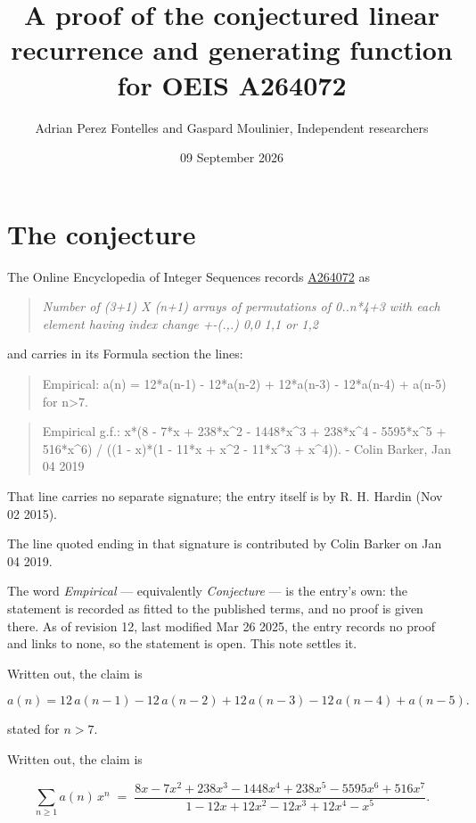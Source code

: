 \documentclass[11pt]{article}
\title{A proof of the conjectured linear recurrence and generating function for OEIS A264072}
\author{Adrian Perez Fontelles and Gaspard Moulinier, Independent researchers}
\date{09 September 2026}
\theoremstyle{definition}
\begin{document}
\maketitle
\section{The conjecture}

The Online Encyclopedia of Integer Sequences records \href{https://oeis.org/A264072}{A264072} as

\begin{quote}\itshape Number of (3+1) X (n+1) arrays of permutations of 0..n*4+3 with each element having index change +-(.,.) 0,0 1,1 or 1,2\end{quote}

and carries in its Formula section the lines:

\begin{quote}\ttfamily Empirical: a(n) = 12*a(n-1) - 12*a(n-2) + 12*a(n-3) - 12*a(n-4) + a(n-5) for n>7.\end{quote}

\begin{quote}\ttfamily Empirical g.f.: x*(8 - 7*x + 238*x\textasciicircum{}2 - 1448*x\textasciicircum{}3 + 238*x\textasciicircum{}4 - 5595*x\textasciicircum{}5 + 516*x\textasciicircum{}6) / ((1 - x)*(1 - 11*x + x\textasciicircum{}2 - 11*x\textasciicircum{}3 + x\textasciicircum{}4)). - Colin Barker, Jan 04 2019\end{quote}

That line carries no separate signature; the entry itself is by R. H. Hardin (Nov 02 2015).

The line quoted ending in that signature is contributed by Colin Barker on Jan 04 2019.

The word {\itshape Empirical} --- equivalently {\itshape Conjecture} --- is the entry's own: the statement is recorded as fitted to the published terms, and no proof is given there. As of revision 12, last modified Mar 26 2025, the entry records no proof and links to none, so the statement is open. This note settles it.

Written out, the claim is

\[a(n) = 12\,a(n-1) - 12\,a(n-2) + 12\,a(n-3) - 12\,a(n-4) + a(n-5).\]

stated for $n > 7$.

Written out, the claim is

\[\sum_{n \ge 1} a(n)\,x^n \;=\; \frac{8x - 7x^{2} + 238x^{3} - 1448x^{4} + 238x^{5} - 5595x^{6} + 516x^{7}}{1 - 12x + 12x^{2} - 12x^{3} + 12x^{4} - x^{5}}.\]
\end{document}
